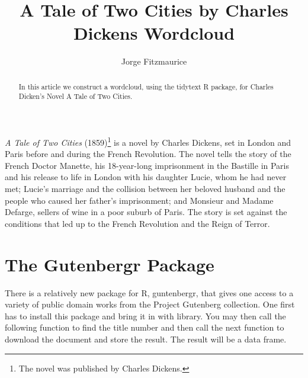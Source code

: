 \documentclass{article}\usepackage[]{graphicx}\usepackage[]{color}
\begin{document}
\title{A Tale of Two Cities by Charles Dickens Wordcloud}
\author{Jorge Fitzmaurice}
\maketitle

\begin{abstract}
In this article we construct a wordcloud, using the tidytext R package, for Charles Dicken's Novel A Tale of Two Cities.


\end{abstract}

\textit{A Tale of Two Cities} (1859)\footnote{The novel was published by Charles Dickens.} is a novel by Charles Dickens, set in London and Paris before and during the French Revolution. The novel tells the story of the French Doctor Manette, his 18-year-long imprisonment in the Bastille in Paris and his release to life in London with his daughter Lucie, whom he had never met; Lucie's marriage and the collision between her beloved husband and the people who caused her father's imprisonment; and Monsieur and Madame Defarge, sellers of wine in a poor suburb of Paris. The story is set against the conditions that led up to the French Revolution and the Reign of Terror.

\section{The Gutenbergr Package}
There is a relatively new package for R, guntenbergr, that gives one access to a variety of public domain works from the Project Gutenberg collection\citep{Silge}.  One first has to install this package and bring it in with library.  You may then call the following function to find the title number and then call the next function to download the document and store the result.  The result will be a data frame.
\end{document}

